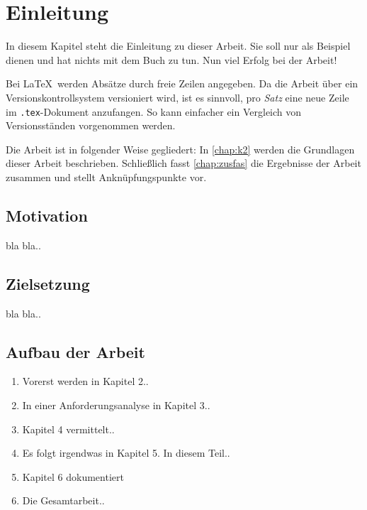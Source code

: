\chapter{Einleitung}

In diesem Kapitel steht die Einleitung zu dieser Arbeit.
Sie soll nur als Beispiel dienen und hat nichts mit dem Buch \cite{WSPA} zu tun.
Nun viel Erfolg bei der Arbeit!

Bei \LaTeX\ werden Absätze durch freie Zeilen angegeben.
Da die Arbeit über ein Versionskontrollsystem versioniert wird, ist es sinnvoll, pro \emph{Satz} eine neue Zeile im \texttt{.tex}-Dokument anzufangen.
So kann einfacher ein Vergleich von Versionsständen vorgenommen werden.

Die Arbeit ist in folgender Weise gegliedert:
In \cref{chap:k2} werden die Grundlagen dieser Arbeit beschrieben.
Schließlich fasst \cref{chap:zusfas} die Ergebnisse der Arbeit zusammen und stellt Anknüpfungspunkte vor.

\section{Motivation}

bla bla..


\section{Zielsetzung}

bla bla..


\section{Aufbau der Arbeit}

\begin{enumerate}
\item Vorerst werden in Kapitel 2..
\item In einer Anforderungsanalyse in Kapitel 3..
\item Kapitel 4 vermittelt..
\item Es folgt irgendwas in Kapitel 5. In diesem Teil..
\item Kapitel 6 dokumentiert
\item Die Gesamtarbeit..
\end{enumerate}

